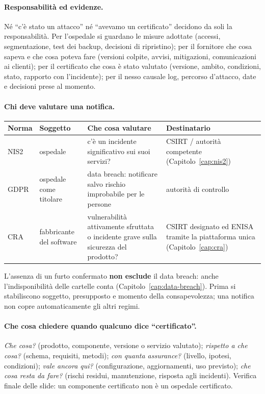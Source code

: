 \paragraph{Responsabilità ed evidenze.} Né ``c'è stato un attacco'' né ``avevamo un certificato''
decidono da soli la responsabilità. Per l'ospedale si guardano le misure adottate (accessi,
segmentazione, test dei backup, decisioni di ripristino); per il fornitore che cosa sapeva e che cosa
poteva fare (versioni colpite, avvisi, mitigazioni, comunicazioni ai clienti); per il certificato che
cosa è stato valutato (versione, ambito, condizioni, stato, rapporto con l'incidente); per il nesso
causale log, percorso d'attacco, date e decisioni prese al momento.

\paragraph{Chi deve valutare una notifica.}
\begin{center}
\small
\begin{tabularx}{\linewidth}{>{\raggedright\arraybackslash}p{1.3cm} >{\raggedright\arraybackslash}p{2.6cm} X X}
\toprule
\textbf{Norma} & \textbf{Soggetto} & \textbf{Che cosa valutare} & \textbf{Destinatario}\\
\midrule
NIS2 & ospedale & c'è un incidente significativo sui suoi servizi? & CSIRT / autorità competente
  (Capitolo~\ref{cap:nis2})\\
GDPR & ospedale come titolare & data breach: notificare salvo rischio improbabile per le persone &
  autorità di controllo\\
CRA & fabbricante del software & vulnerabilità attivamente sfruttata o incidente grave sulla sicurezza
  del prodotto? & CSIRT designato ed ENISA tramite la piattaforma unica (Capitolo~\ref{cap:cra})\\
\bottomrule
\end{tabularx}
\end{center}
L'assenza di un furto confermato \textbf{non esclude} il data breach: anche l'indisponibilità delle cartelle
conta (Capitolo~\ref{cap:data-breach}). Prima si stabiliscono soggetto, presupposto e momento della
consapevolezza; una notifica non copre automaticamente gli altri regimi.

\paragraph{Che cosa chiedere quando qualcuno dice ``certificato''.} \emph{Che cosa?} (prodotto,
componente, versione o servizio valutato); \emph{rispetto a che cosa?} (schema, requisiti, metodi);
\emph{con quanta assurance?} (livello, ipotesi, condizioni); \emph{vale ancora qui?} (configurazione,
aggiornamenti, uso previsto); \emph{che cosa resta da fare?} (rischi residui, manutenzione, risposta agli
incidenti). Verifica finale delle slide: un componente certificato non è un ospedale certificato.

